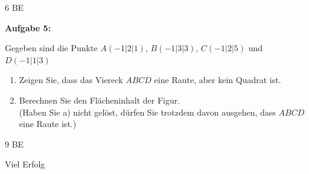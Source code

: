 \documentclass[a4paper,12pt]{article}
\newcommand{\Aufgabe}[1]{
  {
  \vspace*{0.5cm}
  \textsf{\textbf{Aufgabe #1}}
  \vspace*{0.2cm}
  
  }
}
\begin{document}
\begin{flushright}6 BE \end{flushright}
\newpage





\Aufgabe {5:} 

Gegeben sind die Punkte $A(-1|2|1)$, $B(-1|3|3)$, $C(-1|2|5)$ und $D(-1|1|3)$

\begin{enumerate}[label={\alph*)}]
  \item Zeigen Sie, dass das Viereck $ABCD$ eine Raute, aber kein Quadrat ist.
  \item Berechnen Sie den Flächeninhalt der Figur.\\
    {\scriptsize(Haben Sie a) nicht gelöst, dürfen Sie trotzdem davon ausgehen, dass $ABCD$ eine Raute ist.)}
\end{enumerate}

\begin{flushright} 9 BE \end{flushright}
\vspace{0,8cm}


\centerline{Viel Erfolg}









\end{document}
